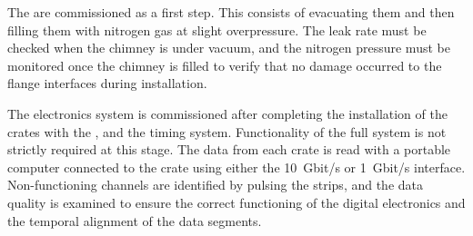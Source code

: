 The  are commissioned as a first step. This consists of evacuating them  and then filling them with nitrogen gas at slight overpressure. The leak rate must be checked when the chimney is under vacuum, and the nitrogen pressure must be monitored once the chimney is filled to verify that no damage occurred to the flange interfaces during installation.

The electronics system is commissioned after completing the installation of the  crates with the , and the timing system.  Functionality of the full  system is not strictly required at this stage. The data from each crate is read with a portable computer connected to the crate using either the  \SI{10}{Gbit/s} or \SI{1}{Gbit/s} interface. Non-functioning channels are identified by pulsing the  strips, and the data quality is examined to ensure the correct functioning of the digital electronics and the temporal alignment of the data segments.   
